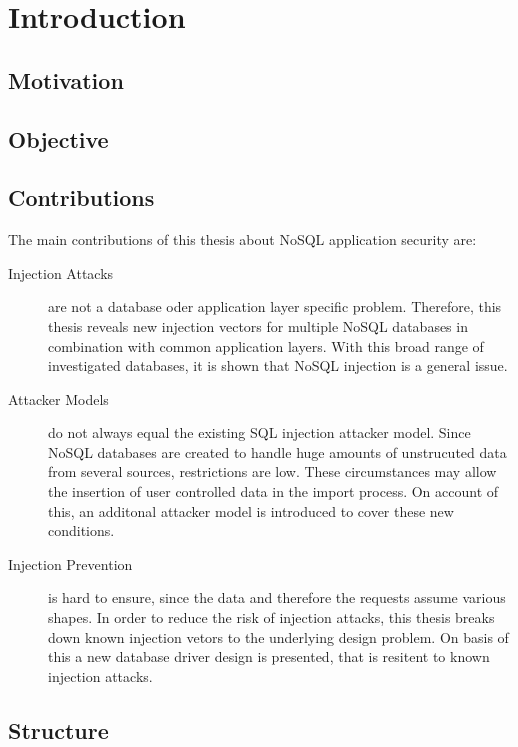 \chapter{Introduction}
\label{cha:introduction}

\section{Motivation}

\section{Objective}

\section{Contributions}

The main contributions of this thesis about NoSQL application security are:
\begin{description}
\item [Injection Attacks] are not a database oder application layer specific problem. Therefore, this thesis reveals new injection vectors for multiple NoSQL databases in combination with common application layers. With this broad range of investigated databases, it is shown that NoSQL injection is a general issue.
\item [Attacker Models] do not always equal the existing SQL injection attacker model. Since NoSQL databases are created to handle huge amounts of unstrucuted data from several sources, restrictions are low. These circumstances may allow the insertion of user controlled data in the import process. On account of this, an additonal attacker model is introduced to cover these new conditions.
\item [Injection Prevention] is hard to ensure, since the data and therefore the requests assume various shapes. In order to reduce the risk of injection attacks, this thesis breaks down known injection vetors to the underlying design problem. On basis of this a new database driver design is presented, that is resitent to known injection attacks.
\end{description}

\section{Structure}
